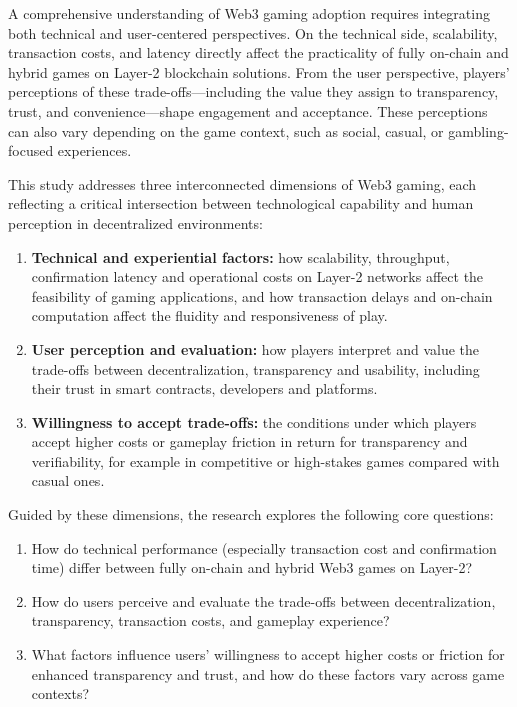\documentclass[10pt,conference]{IEEEtran}
\begin{document}
A comprehensive understanding of Web3 gaming adoption requires integrating both technical and user-centered perspectives. On the technical side, scalability, transaction costs, and latency directly affect the practicality of fully on-chain and hybrid games on Layer-2 blockchain solutions. From the user perspective, players’ perceptions of these trade-offs—including the value they assign to transparency, trust, and convenience—shape engagement and acceptance. These perceptions can also vary depending on the game context, such as social, casual, or gambling-focused experiences.

This study addresses three interconnected dimensions of Web3 gaming, each reflecting a critical intersection between technological capability and human perception in decentralized environments:

\begin{enumerate}
    \item \textbf{Technical and experiential factors:} how scalability, throughput, confirmation latency and operational costs on Layer-2 networks affect the feasibility of gaming applications, and how transaction delays and on-chain computation affect the fluidity and responsiveness of play.

    \item \textbf{User perception and evaluation:} how players interpret and value the trade-offs between decentralization, transparency and usability, including their trust in smart contracts, developers and platforms.

    \item \textbf{Willingness to accept trade-offs:} the conditions under which players accept higher costs or gameplay friction in return for transparency and verifiability, for example in competitive or high-stakes games compared with casual ones.
\end{enumerate}


Guided by these dimensions, the research explores the following core questions:
\begin{enumerate}
    \item How do technical performance (especially transaction cost and confirmation time) differ between fully on-chain and hybrid Web3 games on Layer-2?
    \item How do users perceive and evaluate the trade-offs between decentralization, transparency, transaction costs, and gameplay experience?
    \item What factors influence users’ willingness to accept higher costs or friction for enhanced transparency and trust, and how do these factors vary across game contexts?
\end{enumerate}
\end{document}
